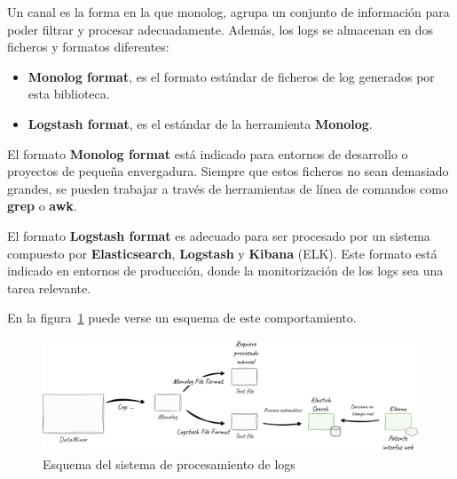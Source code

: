 Un canal es la forma en la que monolog, agrupa un conjunto de información para poder filtrar y procesar adecuadamente.
Además, los logs se almacenan en dos ficheros y formatos diferentes:

\begin{itemize}
    \item \textbf{Monolog format}, es el formato estándar de ficheros de log generados por esta biblioteca.
    \item \textbf{Logstash format}, es el estándar de la herramienta \textbf{Monolog}.
\end{itemize}

El formato \textbf{Monolog format} está indicado para entornos de desarrollo o proyectos de pequeña envergadura.
Siempre que estos ficheros no sean demasiado grandes, se pueden trabajar a través de herramientas de línea de comandos
como \textbf{grep} o \textbf{awk}.

El formato \textbf{Logstash format} es adecuado para ser procesado por un sistema compuesto por
\textbf{Elasticsearch}, \textbf{Logstash} y \textbf{Kibana} (ELK).
Este formato está indicado en entornos de producción, donde la monitorización de los logs sea una tarea relevante.

En la figura~\ref{fig:chapter_4.4.logs_overview} puede verse un esquema de este comportamiento.

\begin{figure}[ht]
    \begin{center}
        \includegraphics[width=\textwidth]{./chapter/4/images/chapter_4.4.logs_overview}
        \caption{Esquema del sistema de procesamiento de logs}
        \label{fig:chapter_4.4.logs_overview}
    \end{center}
\end{figure}